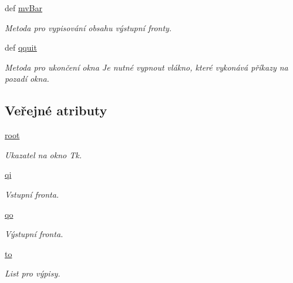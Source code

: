 \begin{DoxyCompactItemize}
def \hyperlink{classmnClean_1_1App_a7e0a0a24e1044ddb6749a380e109f84a}{mv\-Bar}
\begin{DoxyCompactList}\small\item\em Metoda pro vypisování obsahu výstupní fronty. \end{DoxyCompactList}\item 
def \hyperlink{classmnClean_1_1App_a1d63ab1d7fe79b555e86748976675a42}{qquit}
\begin{DoxyCompactList}\small\item\em Metoda pro ukončení okna Je nutné vypnout vlákno, které vykonává příkazy na pozadí okna. \end{DoxyCompactList}\end{DoxyCompactItemize}
\subsection*{Veřejné atributy}
\begin{DoxyCompactItemize}
\item 
\hypertarget{classmnClean_1_1App_ae2c3e708349860bf01847f7d91a6b68c}{\hyperlink{classmnClean_1_1App_ae2c3e708349860bf01847f7d91a6b68c}{root}}\label{dc/dd1/classmnClean_1_1App_ae2c3e708349860bf01847f7d91a6b68c}

\begin{DoxyCompactList}\small\item\em Ukazatel na okno Tk. \end{DoxyCompactList}\item 
\hypertarget{classmnClean_1_1App_aff506d49c1b70304ed8d1ab71c0867f4}{\hyperlink{classmnClean_1_1App_aff506d49c1b70304ed8d1ab71c0867f4}{qi}}\label{dc/dd1/classmnClean_1_1App_aff506d49c1b70304ed8d1ab71c0867f4}

\begin{DoxyCompactList}\small\item\em Vstupní fronta. \end{DoxyCompactList}\item 
\hypertarget{classmnClean_1_1App_a2c55a4f46b8330a59ecda0d304337126}{\hyperlink{classmnClean_1_1App_a2c55a4f46b8330a59ecda0d304337126}{qo}}\label{dc/dd1/classmnClean_1_1App_a2c55a4f46b8330a59ecda0d304337126}

\begin{DoxyCompactList}\small\item\em Výstupní fronta. \end{DoxyCompactList}\item 
\hypertarget{classmnClean_1_1App_a0488ae03eb3544bfd12d9a82eddfa58d}{\hyperlink{classmnClean_1_1App_a0488ae03eb3544bfd12d9a82eddfa58d}{to}}\label{dc/dd1/classmnClean_1_1App_a0488ae03eb3544bfd12d9a82eddfa58d}

\begin{DoxyCompactList}\small\item\em List pro výpisy. \end{DoxyCompactList}\end{DoxyCompactItemize}


